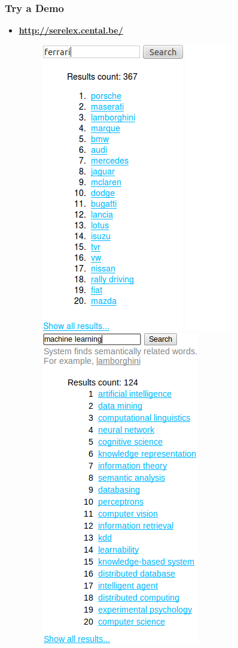 \documentclass{beamer}
\begin{document}
\begin{frame}
\frametitle{Try a Demo}

\begin{itemize}
  \item {\bf \url{http://serelex.cental.be/} }
  
\begin{figure}	
	\centering
		\includegraphics[height=0.6\textwidth]{figures/serelex}
		\includegraphics[height=0.5\textwidth]{figures/spacer}
		\includegraphics[height=0.6\textwidth]{figures/serelex-ml}
		\end{figure}
\end{itemize}

\end{frame}
\end{document}
